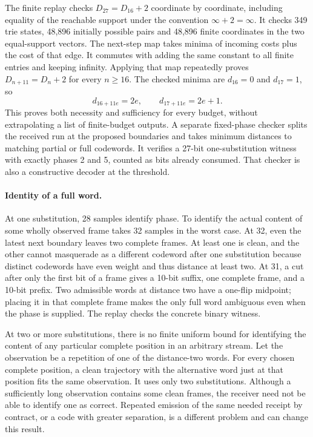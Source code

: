 \documentclass{article}
\begin{document}
The finite replay checks \(D_{27}=D_{16}+2\) coordinate by
coordinate, including equality of the reachable support under
the convention \(\infty+2=\infty\). It checks 349 trie states,
48,896 initially possible pairs and 48,896 finite coordinates
in the two equal-support vectors. The next-step map takes
minima of incoming costs plus the cost of that edge. It
commutes with adding the same constant to all finite entries
and keeping infinity. Applying that map repeatedly proves
\(D_{n+11}=D_n+2\) for every \(n\geq16\). The checked minima
are \(d_{16}=0\) and \(d_{17}=1\), so
\[
  d_{16+11e}=2e,\qquad d_{17+11e}=2e+1.
\]
This proves both necessity and sufficiency for every budget,
without extrapolating a list of finite-budget outputs. A separate
fixed-phase checker splits the received run at the proposed
boundaries and takes minimum distances to matching partial or full
codewords. It verifies a 27-bit one-substitution witness with
exactly phases 2 and 5, counted as bits already consumed.
That checker is also a constructive decoder at the threshold.

\paragraph{Identity of a full word.}
At one substitution, 28 samples identify phase. To identify the
actual content of some wholly observed frame takes 32 samples in
the worst case. At 32, even the latest next boundary leaves two
complete frames. At least one is clean, and the other cannot
masquerade as a different codeword after one substitution because
distinct codewords have even weight and thus distance at least
two. At 31, a cut after only the first bit of a frame gives a
10-bit suffix, one complete frame, and a 10-bit prefix. Two
admissible words at distance two have a one-flip midpoint;
placing it in that complete frame makes the only full word
ambiguous even when the phase is supplied. The replay checks
the concrete binary witness.

At two or more substitutions, there is no finite uniform bound
for identifying the content of any particular complete position
in an arbitrary stream. Let the observation be a repetition
of one of the distance-two words. For every chosen complete
position, a clean trajectory with the alternative word just
at that position fits the same observation. It uses only two
substitutions. Although a sufficiently long observation
contains some clean frames, the receiver need not be able to
identify one as correct. Repeated emission of the same needed
receipt by contract, or a code with greater separation, is a
different problem and can change this result.
\end{document}
